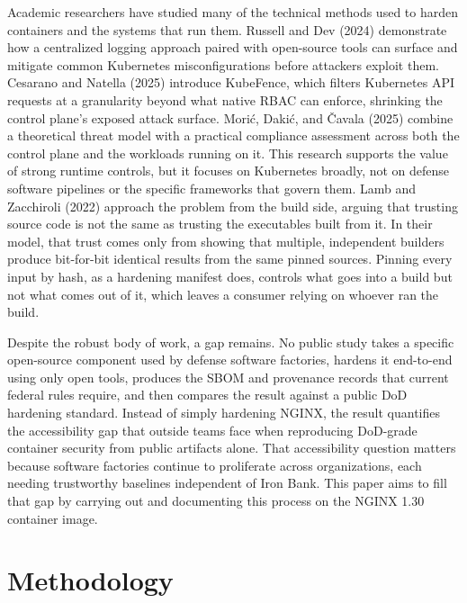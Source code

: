 \documentclass[10pt,letterpaper,twocolumn]{article}
\begin{document}
Academic researchers have studied many of the technical methods used to harden containers and the systems that run them. Russell and Dev (2024) demonstrate how a centralized logging approach paired with open-source tools can surface and mitigate common Kubernetes misconfigurations before attackers exploit them. Cesarano and Natella (2025) introduce KubeFence, which filters Kubernetes API requests at a granularity beyond what native RBAC can enforce, shrinking the control plane's exposed attack surface. Morić, Dakić, and Čavala (2025) combine a theoretical threat model with a practical compliance assessment across both the control plane and the workloads running on it. This research supports the value of strong runtime controls, but it focuses on Kubernetes broadly, not on defense software pipelines or the specific frameworks that govern them. Lamb and Zacchiroli (2022) approach the problem from the build side, arguing that trusting source code is not the same as trusting the executables built from it. In their model, that trust comes only from showing that multiple, independent builders produce bit-for-bit identical results from the same pinned sources. Pinning every input by hash, as a hardening manifest does, controls what goes into a build but not what comes out of it, which leaves a consumer relying on whoever ran the build.

Despite the robust body of work, a gap remains. No public study takes a specific open-source component used by defense software factories, hardens it end-to-end using only open tools, produces the SBOM and provenance records that current federal rules require, and then compares the result against a public DoD hardening standard. Instead of simply hardening NGINX, the result quantifies the accessibility gap that outside teams face when reproducing DoD-grade container security from public artifacts alone. That accessibility question matters because software factories continue to proliferate across organizations, each needing trustworthy baselines independent of Iron Bank. This paper aims to fill that gap by carrying out and documenting this process on the NGINX 1.30 container image.

\section{Methodology}
\end{document}
